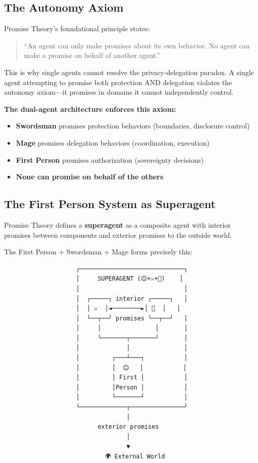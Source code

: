 \documentclass[
  11pt,
]{article}
\providecommand{\tightlist}{%
  \setlength{\itemsep}{0pt}\setlength{\parskip}{0pt}}
\begin{document}
\subsection{The Autonomy Axiom}\label{the-autonomy-axiom}

Promise Theory's foundational principle states:

\begin{quote}
``An agent can only make promises about its own behavior. No agent can
make a promise on behalf of another agent.''
\end{quote}

This is why single agents cannot resolve the privacy-delegation paradox.
A single agent attempting to promise both protection AND delegation
violates the autonomy axiom---it promises in domains it cannot
independently control.

\textbf{The dual-agent architecture enforces this axiom:}

\begin{itemize}
\tightlist
\item
  \textbf{Swordsman} promises protection behaviors (boundaries,
  disclosure control)
\item
  \textbf{Mage} promises delegation behaviors (coordination, execution)
\item
  \textbf{First Person} promises authorization (sovereignty decisions)
\item
  \textbf{None can promise on behalf of the others}
\end{itemize}

\subsection{The First Person System as
Superagent}\label{the-first-person-system-as-superagent}

Promise Theory defines a \textbf{superagent} as a composite agent with
interior promises between components and exterior promises to the
outside world.

The First Person + Swordsman + Mage forms precisely this:

\begin{verbatim}
                    ┌─────────────────────────────┐
                    │     SUPERAGENT (😊+⚔️+🧙)    │
                    │                             │
                    │  ┌─────┐ interior ┌─────┐   │
                    │  │ ⚔️  │◄────────►│ 🧙  │   │
                    │  └──┬──┘ promises └──┬──┘   │
                    │     │               │       │
                    │     └───────┬───────┘       │
                    │             │               │
                    │         ┌───┴───┐           │
                    │         │  😊   │           │
                    │         │ First │           │
                    │         │Person │           │
                    │         └───────┘           │
                    └─────────────┬───────────────┘
                                  │
                          exterior promises
                                  │
                                  ▼
                            🌍 External World
\end{verbatim}
\end{document}
